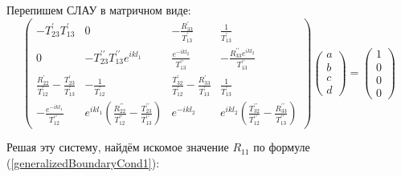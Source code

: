 \documentclass[a4 paper, 12 pt]{extarticle}
\begin{document}
   Перепишем СЛАУ в матричном виде:
   \[
   \begin{pmatrix}
   -T_{23}^{\prime}T_{13}^{\prime} & 0 & -\frac{R_{33}^{\prime}}{T_{13}^\prime} & \frac{1}{T_{13}^\prime}\\ 
   0 & -T_{23}^{\prime\prime} T_{13}^{\prime\prime} e^{ikl_1}  & \frac{e^{-ikl_2}}{T_{13}^{\prime\prime}} & -\frac{R_{33}^{\prime\prime}e^{ikl_2}}{T_{13}^{\prime\prime}} \\ 
   \frac{R_{22}^{\prime}}{T_{12}^{\prime}}-\frac{T_{23}^{\prime}}{T_{13}^{\prime}} & -\frac{1}{T_{12}^{\prime}} & \frac{T_{32}^{\prime}}{T_{12}^{\prime}}-\frac{R_{33}^{\prime}}{T_{13}^{\prime}} & \frac{1}{T_{13}^{\prime}}\\ 
   -\frac{e^{-ikl_1}}{T_{12}^{\prime\prime}} & e^{ikl_1}\left(\frac{R_{22}^{\prime\prime}}{T_{12}^{\prime\prime}} - \frac{T_{23}^{\prime\prime}}{T_{13}^{\prime\prime}}\right) & e^{-ikl_2} & e^{ikl_2}\left(\frac{T_{32}^{\prime\prime}}{T_{12}^{\prime\prime}} - \frac{R_{33}^{\prime\prime}}{T_{13}^{\prime\prime}}\right)
   \end{pmatrix}
   \begin{pmatrix}
   a \\
   b \\
   c \\
   d
   \end{pmatrix} = 
   \begin{pmatrix}
   1 \\
   0 \\
   0 \\
   0 
   \end{pmatrix}\]
   
   Решая эту систему, найдём искомое значение $R_{11}$ по формуле (\ref{generalizedBoundaryCond1}): 
  
\end{document}
